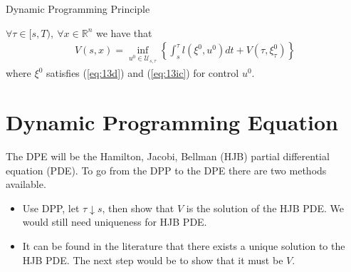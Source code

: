 \begin{theorem}{Dynamic Programming Principle}

$\forall \tau\in[s,T), ~\forall x\in\mathbb{R}^n$ we have that
\begin{align}
\label{eq:13dpp}
V(s,x) = \inf_{u^0\in\mathcal{U}_{s,\tau}} \left\lbrace \int_s^\tau l(\xi^0,u^0)dt + V(\tau,\xi_\tau^0) \right\rbrace
\end{align}
where $\xi^0$ satisfies (\ref{eq:13d}) and (\ref{eq:13ic}) for control $u^0$.
\end{theorem}

\section{Dynamic Programming Equation}
The DPE will be the Hamilton, Jacobi, Bellman (HJB) partial differential equation (PDE). To go from the DPP to the DPE there are two methods available.
\begin{itemize}
\item Use DPP, let $\tau\downarrow s$, then show that $V$ is the solution of the HJB PDE. We would still need uniqueness for HJB PDE.
\item It can be found in the literature that there exists a unique solution to the HJB PDE. The next step would be to show that it must be $V$.
\end{itemize}

